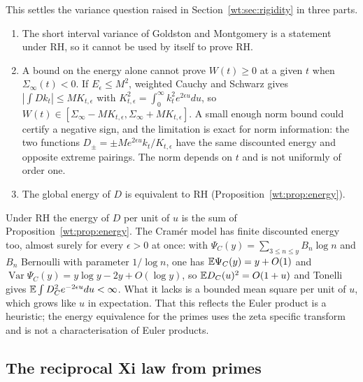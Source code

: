 This settles the variance question raised in Section~\ref{wt:sec:rigidity} in three parts.
\begin{enumerate}
\item The short interval variance of Goldston and Montgomery is a statement under RH, so it cannot be used by itself to prove RH.
\item A bound on the energy alone cannot prove $W(t)\ge0$ at a given $t$ when $\Sigma_\infty(t)<0$. If $E_\epsilon\le M^2$, weighted Cauchy and Schwarz gives $|\int Dk_t|\le MK_{t,\epsilon}$ with $K_{t,\epsilon}^2=\int_0^\infty k_t^2e^{2\epsilon u}du$, so $W(t)\in[\Sigma_\infty-MK_{t,\epsilon},\Sigma_\infty+MK_{t,\epsilon}]$. A small enough norm bound could certify a negative sign, and the limitation is exact for norm information: the two functions $D_\pm=\pm Me^{2\epsilon u}k_t/K_{t,\epsilon}$ have the same discounted energy and opposite extreme pairings. The norm depends on $t$ and is not uniformly of order one.
\item The global energy of $D$ is equivalent to RH (Proposition~\ref{wt:prop:energy}).
\end{enumerate}
Under RH the energy of $D$ per unit of $u$ is the sum of Proposition~\ref{wt:prop:energy}. The Cram\'er model has finite discounted energy too, almost surely for every $\epsilon>0$ at once: with $\Psi_C(y)=\sum_{3\le n\le y}B_n\log n$ and $B_n$ Bernoulli with parameter $1/\log n$, one has $\mathbb{E}\Psi_C(y)=y+O(1)$ and $\operatorname{Var}\Psi_C(y)=y\log y-2y+O(\log y)$, so $\mathbb{E} D_C(u)^2=O(1+u)$ and Tonelli gives $\mathbb{E}\int D_C^2e^{-2\epsilon u}du<\infty$. What it lacks is a bounded mean square per unit of $u$, which grows like $u$ in expectation. That this reflects the Euler product is a heuristic; the energy equivalence for the primes uses the zeta specific transform and is not a characterisation of Euler products.

\subsection{The reciprocal Xi law from primes}\label{wt:sec:cumulants}

